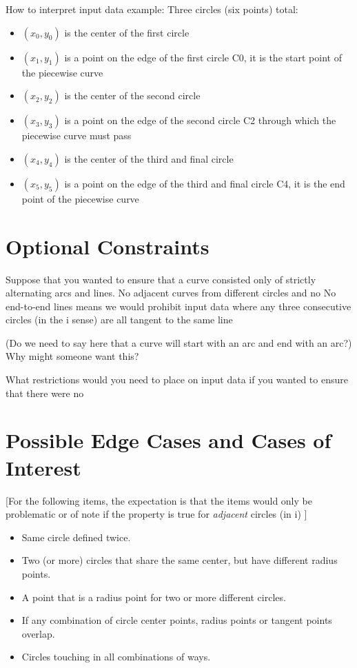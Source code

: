 \documentclass[sigconf]{acmart}
\begin{document}

How to interpret input data example:
Three circles (six points) total:
\begin{itemize}
    \item $(x_0, y_0)$ is the center of the first circle
    \item $(x_1, y_1)$ is a point on the edge of the first circle C0, it is the start point of the piecewise curve
    \item $(x_2, y_2)$ is the center of the second circle
    \item $(x_3, y_3)$ is a point on the edge of the second circle C2 through which the piecewise curve must pass
    \item $(x_4, y_4)$ is the center of the third and final circle
    \item $(x_5, y_5)$ is a point on the edge of the third and final circle C4, it is the end point of the piecewise curve
\end{itemize}


\section{Optional Constraints}
Suppose that you wanted to ensure that a curve consisted only of strictly alternating arcs and lines. No adjacent curves from different circles and no No end-to-end lines means we would prohibit input data where any three consecutive circles (in the i sense) are all tangent to the same line

(Do we need to say here that a curve will start with an arc and end with an arc?)
Why might someone want this?



What restrictions would you need to place on input data if you wanted to ensure that there were no 


\section{Possible Edge Cases and Cases of Interest}

[For the following items, the expectation is that the items would only be problematic or of note if the property is true for \textit{adjacent} circles (in i) ]
\begin{itemize}
    \item Same circle defined twice.
    \item Two (or more) circles that share the same center, but have different radius points.
    \item A point that is a radius point for two or more different circles.
    \item If any combination of circle center points, radius points or tangent points overlap.
    \item Circles touching in all combinations of ways.
\end{itemize}
\end{document}
